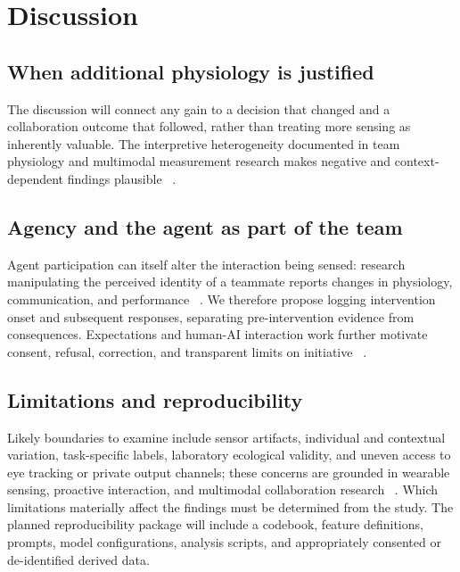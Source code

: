 \section{Discussion}
\label{sec:10}

\subsection{When additional physiology is justified}

The discussion will connect any gain to a decision that changed and a collaboration outcome that followed, rather than treating more sensing as inherently valuable. The interpretive heterogeneity documented in team physiology and multimodal measurement research makes negative and context-dependent findings plausible ~\cite{p32,p23,p57}.


\subsection{Agency and the agent as part of the team}

Agent participation can itself alter the interaction being sensed: research manipulating the perceived identity of a teammate reports changes in physiology, communication, and performance ~\cite{p53}. We therefore propose logging intervention onset and subsequent responses, separating pre-intervention evidence from consequences. Expectations and human-AI interaction work further motivate consent, refusal, correction, and transparent limits on initiative ~\cite{expect,p3}.


\subsection{Limitations and reproducibility}

Likely boundaries to examine include sensor artifacts, individual and contextual variation, task-specific labels, laboratory ecological validity, and uneven access to eye tracking or private output channels; these concerns are grounded in wearable sensing, proactive interaction, and multimodal collaboration research ~\cite{artifacts,hhiss,crop,speaker,p57}. Which limitations materially affect the findings must be determined from the study. The planned reproducibility package will include a codebook, feature definitions, prompts, model configurations, analysis scripts, and appropriately consented or de-identified derived data.

